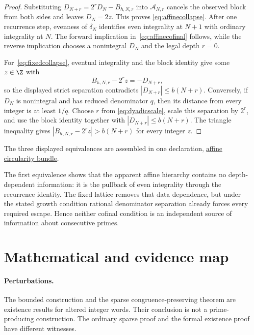 \begin{proof}
Substituting $D_{N+r}=2^rD_N-B_{h,N,r}$ into $\mathcal A_{N,r}$ cancels the
observed block from both sides and leaves $D_N=2z$.  This proves
\eqref{eq:affinecollapse}.  After one recurrence step, evenness of
$\delta_N$ identifies even integrality at $N+1$ with ordinary integrality at
$N$.  The forward implication in~\eqref{eq:affinecofinal} follows, while the
reverse implication chooses a nonintegral $D_N$ and the legal depth $r=0$.

For~\eqref{eq:fixedcollapse}, eventual integrality and the block identity give
some $z\in\Z$ with
\[
 B_{h,N,r}-2^rz=-D_{N+r},
\]
so the displayed strict separation contradicts $|D_{N+r}|\le b(N+r)$.
Conversely, if $D_N$ is nonintegral and has reduced denominator $q$, then its
distance from every integer is at least $1/q$.  Choose $r$ from
\eqref{eq:dyadicscale}, scale this separation by $2^r$, and use the block
identity together with $|D_{N+r}|\le b(N+r)$.  The triangle inequality gives
$|B_{h,N,r}-2^rz|>b(N+r)$ for every integer $z$.
\end{proof}

\noindent The three displayed equivalences are assembled in one declaration,
\href{https://github.com/wcook04/plectis-erdos/blob/3d6d938d696fed0fb71dd55115a18a73738ff223/lean/ErdosProblems/Erdos251/PaperCoreR7.lean\#L241}{affine circularity bundle}.

The first equivalence shows that the apparent affine hierarchy contains no
depth-dependent information: it is the pullback of even integrality through
the recurrence identity.  The fixed lattice removes that data dependence, but
under the stated growth condition rational denominator separation already
forces every required escape.  Hence neither cofinal condition is an
independent source of information about consecutive primes.

\section{Mathematical and evidence map}\label{sec:erdos-251-complete-family-map}
\paragraph{Perturbations.}
The bounded construction and the sparse congruence-preserving theorem are
existence results for altered integer words.  Their conclusion is not a
prime-producing construction.  The ordinary sparse proof and the formal
existence proof have different witnesses.

